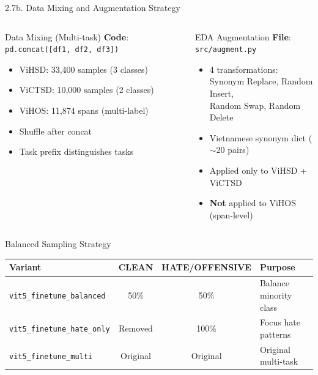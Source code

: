 \documentclass[11pt, aspectratio=169]{beamer}
\begin{document}
\begin{frame}[shrink=8]{2.7b. Data Mixing and Augmentation Strategy}

\begin{columns}[T]
  \begin{block}{Data Mixing (Multi-task)}
    \textbf{Code}: \texttt{pd.concat([df1, df2, df3])}
    \begin{itemize}
      \item ViHSD: 33,400 samples (3 classes)
      \item ViCTSD: 10,000 samples (2 classes)
      \item ViHOS: 11,874 spans (multi-label)
      \item Shuffle after concat
      \item Task prefix distinguishes tasks
    \end{itemize}
  \end{block}

  \begin{block}{EDA Augmentation}
    \textbf{File}: \texttt{src/augment.py}
    \begin{itemize}
      \item 4 transformations:\\
        Synonym Replace, Random Insert,\\
        Random Swap, Random Delete
      \item Vietnamese synonym dict ($\sim$20 pairs)
      \item Applied only to ViHSD + ViCTSD
      \item \textbf{Not} applied to ViHOS (span-level)
    \end{itemize}
  \end{block}
\end{columns}

\vspace{0.3cm}
\begin{block}{Balanced Sampling Strategy}
  \centering
  \begin{tabular}{lccl}
    \toprule
    \textbf{Variant} & \textbf{CLEAN} & \textbf{HATE/OFFENSIVE} & \textbf{Purpose} \\
    \midrule
    \texttt{vit5\_finetune\_balanced} & 50\% & 50\% & Balance minority class \\
    \texttt{vit5\_finetune\_hate\_only} & Removed & 100\% & Focus hate patterns \\
    \texttt{vit5\_finetune\_multi} & Original & Original & Original multi-task \\
    \bottomrule
  \end{tabular}
\end{block}
\end{frame}
\end{document}
